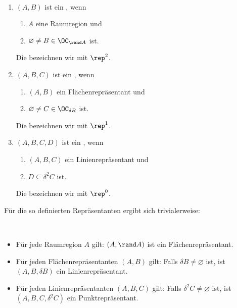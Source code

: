     \begin{dfn}[Repräsentanten]\label{dfn:repr}\ \vspace{0pt}

        \begin{enumerate}
            \item $(A,B)$ ist ein , wenn 
                \begin{enumerate}
                    \item $A$ eine Raumregion und
                    \item $\varnothing \neq B \in \OC_{\rand A}$ ist.
                \end{enumerate}
                Die  bezeichnen wir mit $\rep^2$.
            \item $(A,B,C)$ ist ein , wenn 
                \begin{enumerate}
                    \item $(A,B)$ ein Flächenrepräsentant und
                    \item $\varnothing \neq C \in \OC_{\delta B}$ ist.
                \end{enumerate}
                Die  bezeichnen wir mit $\rep^1$.
            \item $(A,B,C,D)$ ist ein , wenn 
                \begin{enumerate}
                    \item $(A,B,C)$ ein Linienrepräsentant und
                    \item $D \subseteq \delta^2 C$ ist.
                \end{enumerate}
                Die  bezeichnen wir mit $\rep^0$.
        \end{enumerate}
    \end{dfn}
%    
    Für die so definierten Repräsentanten ergibt sich trivialerweise:
%    
    \begin{satz}\ \vspace{0pt}
    
        \begin{itemize}
            \item Für jede Raumregion $A$ gilt: $(A, \rand A)$ ist ein Flächenrepräsentant.
            \item Für jeden Flächenrepräsentanten $(A,B)$ gilt: 
                Falls $\delta B \neq \varnothing$ ist, ist $(A, B, \delta B)$ ein Linienrepräsentant.
            \item Für jeden Linienrepräsentanten $(A,B,C)$ gilt: 
                Falls $\delta^2 C \neq \varnothing$ ist, ist $(A, B, C, \delta^2 C)$ ein Punktrepräsentant.
        \end{itemize}
        
    \end{satz}
